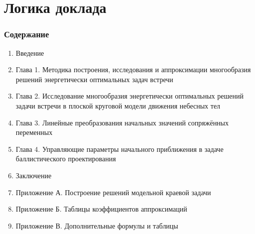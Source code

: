 \section{Логика доклада}

\begin{frame}
    \frametitle{Содержание}
    \presentationtextsize
    \begin{enumerate}
        \setlength\itemsep{0.12cm}
        \item Введение
        \item Глава 1. Методика построения, исследования и аппроксимации многообразия решений энергетически оптимальных задач встречи
        \item Глава 2. Исследование многообразия энергетически оптимальных решений задачи встречи в плоской круговой модели движения небесных тел
        \item Глава 3. Линейные преобразования начальных значений сопряжённых переменных
        \item Глава 4. Управляющие параметры начального приближения в задаче баллистического проектирования
        \item Заключение
        \item Приложение А. Построение решений модельной краевой задачи
        \item Приложение Б. Таблицы коэффициентов аппроксимаций
        \item Приложение В. Дополнительные формулы и таблицы
    \end{enumerate}
\end{frame}
